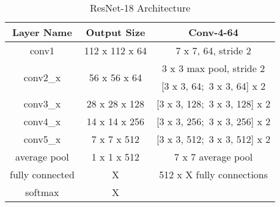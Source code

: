 \vspace*{1.0cm}


\begin{table*}[hbt!]
\begin{center}
\begin{tabular}{|c|c|c|}
\hline
Layer Name             & Output Size                   & Conv-4-64                 \\ \hline\hline
conv1                     & 112 x 112 x 64                & 7 x 7, 64, stride 2        \\ \hline
\multirow{2}{*}{conv2\_x} & \multirow{2}{*}{56 x 56 x 64} & 3 x 3 max pool, stride 2   \\ \cline{3-3} 
                          &                               & [3 x 3, 64$;$ 3 x 3, 64] x 2   \\ \hline
conv3\_x                  & 28 x 28 x 128                 & [3 x 3, 128$;$ 3 x 3, 128] x 2 \\ \hline
conv4\_x                  & 14 x 14 x 256                 & [3 x 3, 256$;$ 3 x 3, 256] x 2 \\ \hline
conv5\_x                  & 7 x 7 x 512                   & [3 x 3, 512$;$ 3 x 3, 512] x 2 \\ \hline
average pool              & 1 x 1 x 512                   & 7 x 7 average pool         \\ \hline
fully connected           & X                             & 512 x X fully connections  \\ \hline
softmax                   & X                             &                            \\ \hline
\end{tabular}
\end{center}
\caption{ResNet-18 Architecture}
\label{table:resnet_arch}
\end{table*}
